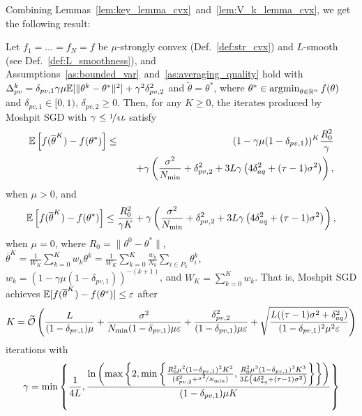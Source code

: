Combining Lemmas~\ref{lem:key_lemma_cvx}~and~\ref{lem:V_k_lemma_cvx}, we get the following result:
\begin{theorem}\label{thm:cvx_convergence_supp}
    Let $f_1 = \ldots = f_N = f$ be $\mu$-strongly convex (Def.~\ref{def:str_cvx}) and $L$-smooth (see Def.~\ref{def:L_smoothness}), and Assumptions~\ref{as:bounded_var}~and~\ref{as:averaging_quality} hold with $\Delta_{pv}^k = \delta_{pv,1}\gamma\mu\mathbb{E}[\|\theta^k-\theta^*\|^2] + \gamma^2\delta_{pv,2}^2$ and $\widetilde{\theta} = \theta^*$, where $\theta^* \in \mathop{\arg\!\min}_{\theta\in\mathbb{R}^n} f(\theta)$ and $\delta_{pv,1}\in [0,1)$, $\delta_{pv,2}\ge 0$. Then, for any $K \ge 0$, the iterates produced by Moshpit SGD with $\gamma \le \nicefrac{1}{4L}$ satisfy
    \begin{eqnarray}
        \mathbb{E}\left[f(\overline{\theta}^K) - f(\theta^*)\right] &\le& (1-\gamma\mu(1-\delta_{pv,1}))^K\frac{R_0^2}{\gamma}\notag\\
        &&\quad + \gamma\left(\frac{\sigma^2}{N_{\min}} + \delta_{pv,2}^2 + 3L\gamma\left(4\delta_{aq}^2 + (\tau-1)\sigma^2\right)\right), \label{eq:str_cvx_bound_supp}
    \end{eqnarray}
    when $\mu > 0$, and
    \begin{equation}
        \mathbb{E}\left[f(\overline{\theta}^K) - f(\theta^*)\right] \le \frac{R_0^2}{\gamma K} + \gamma\left(\frac{\sigma^2}{N_{\min}} + \delta_{pv,2}^2 + 3L\gamma\left(4\delta_{aq}^2 + (\tau-1)\sigma^2\right)\right), \label{eq:cvx_bound_supp}
    \end{equation}
    when $\mu = 0$, where $R_0 = \|\theta^0 - \theta^*\|$, $\overline{\theta}^K = \frac{1}{W_K}\sum_{k=0}^Kw_k\theta^k = \frac{1}{W_K}\sum_{k=0}^K\frac{w_k}{N_k}\sum_{i\in P_k}\theta_i^k$, $w_k = (1-\gamma\mu(1-\delta_{pv,1}))^{-(k+1)}$, and $W_K = \sum_{k=0}^Kw_k$. That is, Moshpit SGD achieves $\mathbb{E}[f(\overline{\theta}^K) - f(\theta^*)] \le \varepsilon$ after 
    \begin{equation}
        K = \widetilde{{\cal O}}\left(\frac{L}{(1-\delta_{pv,1})\mu} +  \frac{\sigma^2}{N_{\min}(1-\delta_{pv,1})\mu\varepsilon} + \frac{\delta_{pv,2}^2}{(1-\delta_{pv,1})\mu\varepsilon} + \sqrt{\frac{L((\tau-1)\sigma^2+\delta_{aq}^2)}{(1-\delta_{pv,1})^2\mu^2\varepsilon}}\right)\label{eq:str_cvx_bound_2_supp}
    \end{equation}
    iterations with
    \begin{equation*}
        \gamma = \min\left\{\frac{1}{4L}, \frac{\ln\left(\max\left\{2, \min\left\{\frac{R_0^2\mu^2(1-\delta_{pv,1})^2K^2}{(\delta_{pv,2}^2 + \nicefrac{\sigma^2}{N_{\min}}) },\frac{R_0^2\mu^3(1-\delta_{pv,1})^3K^3}{3L\left(4\delta_{aq}^2 + (\tau-1)\sigma^2\right)}\right\}\right\}\right)}{(1-\delta_{pv,1})\mu K}\right\}

\end{equation*}
\end{theorem}
